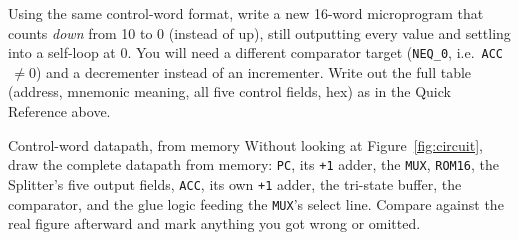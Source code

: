 \documentclass[11pt]{article}
\begin{document}
\begin{writecode}
Using the same control-word format, write a new 16-word microprogram that counts
\emph{down} from 10 to 0 (instead of up), still outputting every value and
settling into a self-loop at 0. You will need a different comparator target
(\texttt{NEQ\_0}, i.e.\ \texttt{ACC}$\,\neq 0$) and a decrementer instead of an
incrementer. Write out the full table (address, mnemonic meaning, all five
control fields, hex) as in the Quick Reference above.
\end{writecode}

\begin{drawex}{Control-word datapath, from memory}
Without looking at Figure~\ref{fig:circuit}, draw the complete datapath from
memory: \texttt{PC}, its \texttt{+1} adder, the \texttt{MUX}, \texttt{ROM16},
the Splitter's five output fields, \texttt{ACC}, its own \texttt{+1} adder, the
tri-state buffer, the comparator, and the glue logic feeding the \texttt{MUX}'s
select line. Compare against the real figure afterward and mark anything you
got wrong or omitted.
\end{drawex}
\end{document}
